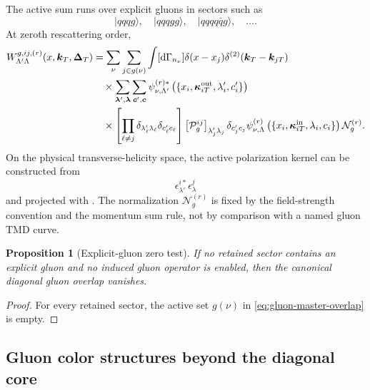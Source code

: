 \documentclass[11pt]{article}
\newtheorem{proposition}[definition]{Proposition}
\newcommand{\kT}{\bm{k}_{T}}
\newcommand{\DT}{\bm{\Delta}_{T}}
\newcommand{\dd}{\mathrm{d}}
\newcommand{\cP}{\mathcal P}
\newcommand{\cN}{\mathcal N}
\begin{document}
The active sum runs over explicit gluons in sectors such as
\begin{equation}
 |qqqg\rangle,
 \quad |qqqgg\rangle,
 \quad |qqqq\bar q g\rangle,
 \quad\ldots.
\label{eq:gluon-containing-sectors}
\end{equation}
At zeroth rescattering order,
\begin{align}
 W_{\Lambda'\Lambda}^{g,ij,(r)}
 (x,\kT,\DT)
 &=\sum_{\nu}
   \sum_{j\in g(\nu)}
   \int[\dd\Gamma_{n_\nu}]
   \delta(x-x_j)\delta^{(2)}(\kT-\bm{k}_{jT})
\nonumber\\
 &\quad\times
 \sum_{\boldsymbol\lambda',\boldsymbol\lambda}
 \sum_{\boldsymbol c',\boldsymbol c}
 \psi_{\nu,\Lambda'}^{(r)*}
 \left(\{x_i,\bm\kappa_{iT}^{\rm out},
             \lambda_i',c_i'\}\right)
\nonumber\\
 &\quad\times
 \left[\prod_{\ell\ne j}
 \delta_{\lambda_\ell'\lambda_\ell}
 \delta_{c_\ell'c_\ell}\right]
 \left[\cP_g^{ij}\right]_{\lambda_j'\lambda_j}
 \delta_{c_j'c_j}
 \psi_{\nu,\Lambda}^{(r)}
 \left(\{x_i,\bm\kappa_{iT}^{\rm in},
             \lambda_i,c_i\}\right)
 \cN_{g}^{(r)}.
\label{eq:gluon-master-overlap}
\end{align}
On the physical transverse-helicity space, the active polarization kernel can
be constructed from
\begin{equation}
 \epsilon_{\lambda'}^{i*}\epsilon_\lambda^j
\label{eq:gluon-active-kernel}
\end{equation}
and projected with
.  The normalization
\(\cN_g^{(r)}\) is fixed by the field-strength convention and the momentum
sum rule, not by comparison with a named gluon TMD curve.

\begin{proposition}[Explicit-gluon zero test]
\label{prop:gluon-zero-test}
If no retained sector contains an explicit gluon and no induced gluon
operator is enabled, then the canonical diagonal gluon overlap vanishes.
\end{proposition}

\begin{proof}
For every retained sector, the active set \(g(\nu)\) in
\cref{eq:gluon-master-overlap} is empty.
\end{proof}

\subsection{Gluon color structures beyond the diagonal core}
\end{document}
